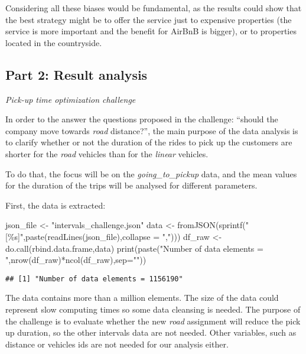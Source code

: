 \documentclass[
]{article}
\newenvironment{Shaded}{\begin{snugshade}}{\end{snugshade}}
\newcommand{\AttributeTok}[1]{\textcolor[rgb]{0.77,0.63,0.00}{#1}}
\newcommand{\FunctionTok}[1]{\textcolor[rgb]{0.00,0.00,0.00}{#1}}
\newcommand{\NormalTok}[1]{#1}
\newcommand{\OtherTok}[1]{\textcolor[rgb]{0.56,0.35,0.01}{#1}}
\newcommand{\SpecialCharTok}[1]{\textcolor[rgb]{0.00,0.00,0.00}{#1}}
\newcommand{\StringTok}[1]{\textcolor[rgb]{0.31,0.60,0.02}{#1}}
\begin{document}
Considering all these biases would be fundamental, as the results could
show that the best strategy might be to offer the service just to
expensive properties (the service is more important and the benefit for
AirBnB is bigger), or to properties located in the countryside.

\hypertarget{part-2-result-analysis}{%
\subsection{Part 2: Result analysis}\label{part-2-result-analysis}}

\emph{Pick-up time optimization challenge}

In order to the answer the questions proposed in the challenge: ``should
the company move towards \emph{road} distance?'', the main purpose of
the data analysis is to clarify whether or not the duration of the rides
to pick up the customers are shorter for the \emph{road} vehicles than
for the \emph{linear} vehicles.

To do that, the focus will be on the \emph{going\_to\_pickup} data, and
the mean values for the duration of the trips will be analysed for
different parameters.

First, the data is extracted:

\begin{Shaded}
\begin{Highlighting}[]
\NormalTok{json\_file }\OtherTok{\textless{}{-}} \StringTok{"intervals\_challenge.json"}
\NormalTok{data }\OtherTok{\textless{}{-}} \FunctionTok{fromJSON}\NormalTok{(}\FunctionTok{sprintf}\NormalTok{(}\StringTok{"[\%s]"}\NormalTok{,}\FunctionTok{paste}\NormalTok{(}\FunctionTok{readLines}\NormalTok{(json\_file),}\AttributeTok{collapse =} \StringTok{","}\NormalTok{)))}
\NormalTok{df\_raw }\OtherTok{\textless{}{-}} \FunctionTok{do.call}\NormalTok{(rbind.data.frame,data)}
\FunctionTok{print}\NormalTok{(}\FunctionTok{paste}\NormalTok{(}\StringTok{"Number of data elements = "}\NormalTok{,}\FunctionTok{nrow}\NormalTok{(df\_raw)}\SpecialCharTok{*}\FunctionTok{ncol}\NormalTok{(df\_raw),}\AttributeTok{sep=}\StringTok{""}\NormalTok{))}
\end{Highlighting}
\end{Shaded}

\begin{verbatim}
## [1] "Number of data elements = 1156190"
\end{verbatim}

The data contains more than a million elements. The size of the data
could represent slow computing times so some data cleansing is needed.
The purpose of the challenge is to evaluate whether the new \emph{road}
assignment will reduce the pick up duration, so the other intervals data
are not needed. Other variables, such as distance or vehicles ids are
not needed for our analysis either.
\end{document}
